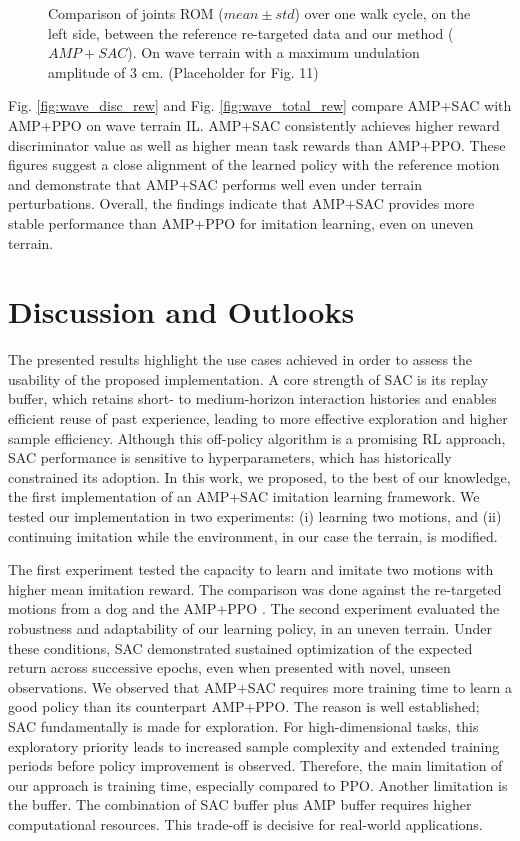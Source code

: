 \documentclass[letterpaper, 10pt, conference]{IEEEtran}
\begin{document}
\begin{figure}[ht]
    \centering
    \caption{Comparison of joints ROM ($mean\pm std$) over one walk cycle, on the left side, between the reference re-targeted data and our method ($AMP+SAC$). On wave terrain with a maximum undulation amplitude of 3 cm. (Placeholder for Fig. 11)}
    \label{fig:wave_rom}
\end{figure}

Fig. \ref{fig:wave_disc_rew} and Fig. \ref{fig:wave_total_rew} compare AMP+SAC with AMP+PPO on wave terrain IL. AMP+SAC consistently achieves higher reward discriminator value as well as higher mean task rewards than AMP+PPO. These figures suggest a close alignment of the learned policy with the reference motion and demonstrate that AMP+SAC performs well even under terrain perturbations. Overall, the findings indicate that AMP+SAC provides more stable performance than AMP+PPO for imitation learning, even on uneven terrain.

\section{Discussion and Outlooks}

The presented results highlight the use cases achieved in order to assess the usability of the proposed implementation. A core strength of SAC is its replay buffer, which retains short- to medium-horizon interaction histories and enables efficient reuse of past experience, leading to more effective exploration and higher sample efficiency. Although this off-policy algorithm is a promising RL approach, SAC performance is sensitive to hyperparameters, which has historically constrained its adoption. In this work, we proposed, to the best of our knowledge, the first implementation of an AMP+SAC imitation learning framework. We tested our implementation in two experiments: (i) learning two motions, and (ii) continuing imitation while the environment, in our case the terrain, is modified.

The first experiment tested the capacity to learn and imitate two motions with higher mean imitation reward. The comparison was done against the re-targeted motions from a dog and the AMP+PPO \cite{Escontrela2022}. The second experiment evaluated the robustness and adaptability of our learning policy, in an uneven terrain. Under these conditions, SAC demonstrated sustained optimization of the expected return across successive epochs, even when presented with novel, unseen observations. We observed that AMP+SAC requires more training time to learn a good policy than its counterpart AMP+PPO. The reason is well established; SAC fundamentally is made for exploration. For high-dimensional tasks, this exploratory priority leads to increased sample complexity and extended training periods before policy improvement is observed. Therefore, the main limitation of our approach is training time, especially compared to PPO. Another limitation is the buffer. The combination of SAC buffer plus AMP buffer requires higher computational resources. This trade-off is decisive for real-world applications.
\end{document}
